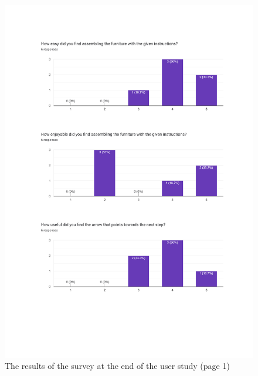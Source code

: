 \documentclass{l4proj}
\begin{document}
\begin{appendices}
\begin{figure}
    \centering
    \includegraphics[width=1\linewidth]{dissertation//images/2ndQuestionnaireResults1.pdf}
    \caption{The results of the survey at the end of the user study (page 1)}
\end{figure}


\end{appendices}
\end{document}
